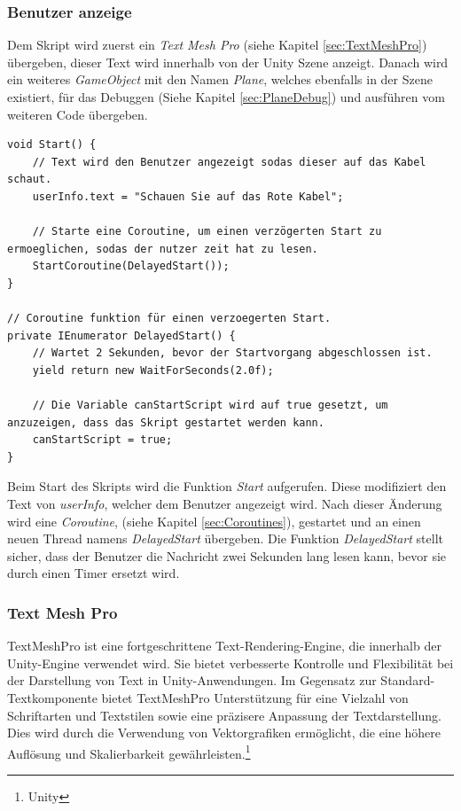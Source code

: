 \subsubsection*{Benutzer anzeige}
Dem Skript wird zuerst ein \textit{Text Mesh Pro} (siehe Kapitel \ref{sec:TextMeshPro}) übergeben, dieser Text wird innerhalb von der Unity Szene anzeigt. Danach wird ein weiteres \textit{GameObject} mit den Namen \textit{Plane}, welches ebenfalls in der Szene existiert, für das Debuggen (Siehe Kapitel \ref{sec:PlaneDebug}) und ausführen vom weiteren Code übergeben.
\begin{lstlisting}[style=csharp, caption={Start des \textit{CableSearch} Skripts}, label=code:CableSearch]
void Start() {
    // Text wird den Benutzer angezeigt sodas dieser auf das Kabel schaut.
    userInfo.text = "Schauen Sie auf das Rote Kabel";

    // Starte eine Coroutine, um einen verzögerten Start zu ermoeglichen, sodas der nutzer zeit hat zu lesen.
    StartCoroutine(DelayedStart());
}

// Coroutine funktion für einen verzoegerten Start.
private IEnumerator DelayedStart() {
    // Wartet 2 Sekunden, bevor der Startvorgang abgeschlossen ist.
    yield return new WaitForSeconds(2.0f);

    // Die Variable canStartScript wird auf true gesetzt, um anzuzeigen, dass das Skript gestartet werden kann.
    canStartScript = true;
}
\end{lstlisting}
Beim Start des Skripts wird die Funktion \textit{Start} aufgerufen. Diese modifiziert den Text von \textit{userInfo}, welcher dem Benutzer angezeigt wird. Nach dieser Änderung wird eine \textit{Coroutine}, (siehe Kapitel \ref{sec:Coroutines}), gestartet und an einen neuen Thread namens \textit{DelayedStart} übergeben. Die Funktion \textit{DelayedStart} stellt sicher, dass der Benutzer die Nachricht zwei Sekunden lang lesen kann, bevor sie durch einen Timer ersetzt wird.

\subsubsection{\label{sec:TextMeshPro}Text Mesh Pro}
TextMeshPro ist eine fortgeschrittene Text-Rendering-Engine, die innerhalb der Unity-Engine verwendet wird. Sie bietet verbesserte Kontrolle und Flexibilität bei der Darstellung von Text in Unity-Anwendungen. Im Gegensatz zur Standard-Textkomponente bietet TextMeshPro Unterstützung für eine Vielzahl von Schriftarten und Textstilen sowie eine präzisere Anpassung der Textdarstellung. Dies wird durch die Verwendung von Vektorgrafiken ermöglicht, die eine höhere Auflösung und Skalierbarkeit gewährleisten.\protect\footnote{Unity\cite{TextMeshPro}}

